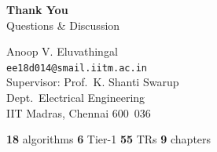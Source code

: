 \documentclass[aspectratio=169, 10pt]{beamer}
\begin{document}
{
\begin{frame}[noframenumbering]
  \begin{columns}[T]
      \vspace{0.8cm}
      \begin{center}
        {\LARGE\bfseries\color{iitmMaroon}Thank You}\\[0.4cm]
        {\large Questions \& Discussion}\\[0.6cm]
        \begin{tcolorbox}[keyfact, title=Contact]
          \scriptsize
          Anoop V. Eluvathingal\\
          \texttt{ee18d014@smail.iitm.ac.in}\\[4pt]
          Supervisor: Prof.\ K. Shanti Swarup\\
          Dept.\ Electrical Engineering\\
          IIT Madras, Chennai 600~036
        \end{tcolorbox}
        \vspace{0.3cm}
        \begin{tcolorbox}[result]
          \scriptsize\centering
          \textbf{18} algorithms \quad \textbf{6} Tier-1 \quad
          \textbf{55} TRs \quad \textbf{9} chapters
        \end{tcolorbox}
      \end{center}


\end{columns}
\end{frame}}
\end{document}
